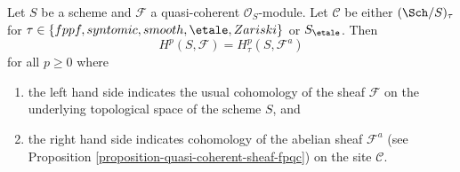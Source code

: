 %
\begin{theorem}
\label{theorem-zariski-fpqc-quasi-coherent}
Let $S$ be a scheme and $\mathcal{F}$ a quasi-coherent $\mathcal{O}_S$-module.
Let $\mathcal{C}$ be either $(\Sch/S)_\tau$ for
$\tau \in \{fppf, syntomic, smooth, \etale, Zariski\}$ or
$S_\etale$. Then
$$
H^p(S, \mathcal{F}) = H^p_\tau(S, \mathcal{F}^a)
$$
for all $p \geq 0$ where
\begin{enumerate}
\item the left hand side indicates the usual cohomology of the sheaf
$\mathcal{F}$ on the underlying topological space of the scheme $S$, and
\item the right hand side indicates cohomology
of the abelian sheaf $\mathcal{F}^a$ (see
Proposition \ref{proposition-quasi-coherent-sheaf-fpqc})
on the site $\mathcal{C}$.
\end{enumerate}
\end{theorem}

